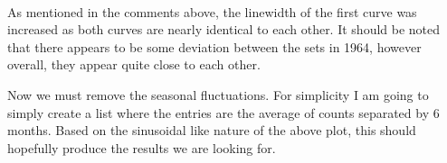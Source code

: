 \documentclass[11pt]{article}
\begin{document}
    \begin{center}
    \end{center}
    { \hspace*{\fill} \\}
    
    As mentioned in the comments above, the linewidth of the first curve was
increased as both curves are nearly identical to each other. It should
be noted that there appears to be some deviation between the sets in
1964, however overall, they appear quite close to each other.

Now we must remove the seasonal fluctuations. For simplicity I am going
to simply create a list where the entries are the average of counts
separated by 6 months. Based on the sinusoidal like nature of the above
plot, this should hopefully produce the results we are looking for.
\end{document}
